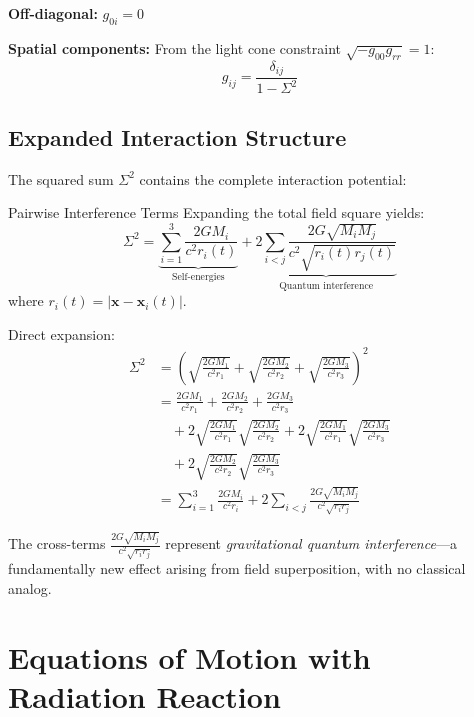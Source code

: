\documentclass[11pt,a4paper]{article}
\theoremstyle{definition}
\theoremstyle{remark}
\begin{document}
		\textbf{Off-diagonal:} $g_{0i} = 0$
		
		\textbf{Spatial components:} From the light cone constraint $\sqrt{-g_{00}g_{rr}} = 1$:
		\begin{equation}
			g_{ij} = \frac{\delta_{ij}}{1-\Sigma^2}
		\end{equation}
	
	\subsection{Expanded Interaction Structure}
	
	The squared sum $\Sigma^2$ contains the complete interaction potential:
	
	Pairwise Interference Terms\label{prop:interference}
		Expanding the total field square yields:
		\begin{equation}\label{eq:Sigma_expanded}
			\Sigma^2 = \underbrace{\sum_{i=1}^3 \frac{2GM_i}{c^2r_i(t)}}_{\text{Self-energies}} + \underbrace{2\sum_{i<j}\frac{2G\sqrt{M_iM_j}}{c^2\sqrt{r_i(t)r_j(t)}}}_{\text{Quantum interference}}
		\end{equation}
		where $r_i(t) = |\mathbf{x} - \mathbf{x}_i(t)|$.
	
		Direct expansion:
		\begin{align}
			\Sigma^2 &= \left(\sqrt{\frac{2GM_1}{c^2r_1}} + \sqrt{\frac{2GM_2}{c^2r_2}} + \sqrt{\frac{2GM_3}{c^2r_3}}\right)^2 \nonumber\\
			&= \frac{2GM_1}{c^2r_1} + \frac{2GM_2}{c^2r_2} + \frac{2GM_3}{c^2r_3} \nonumber\\
			&\quad + 2\sqrt{\frac{2GM_1}{c^2r_1}}\sqrt{\frac{2GM_2}{c^2r_2}} + 2\sqrt{\frac{2GM_1}{c^2r_1}}\sqrt{\frac{2GM_3}{c^2r_3}} \nonumber\\
			&\quad + 2\sqrt{\frac{2GM_2}{c^2r_2}}\sqrt{\frac{2GM_3}{c^2r_3}} \nonumber\\
			&= \sum_{i=1}^3 \frac{2GM_i}{c^2r_i} + 2\sum_{i<j}\frac{2G\sqrt{M_iM_j}}{c^2\sqrt{r_ir_j}}
		\end{align}
	
	The cross-terms $\frac{2G\sqrt{M_iM_j}}{c^2\sqrt{r_ir_j}}$ represent \emph{gravitational quantum interference}—a fundamentally new effect arising from field superposition, with no classical analog.
	
	\section{Equations of Motion with Radiation Reaction}
	
\end{document}
